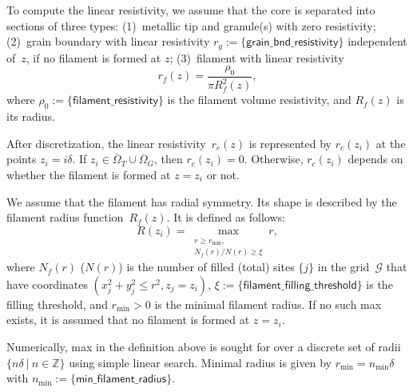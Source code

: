 \documentclass[10pt]{article}
\begin{document}
To compute the linear resistivity, we assume that the core is separated into
sections of three types: (1)~metallic tip and granule(s) with zero resistivity;
(2)~grain boundary with linear resistivity
$r_g := \{ \mathsf{grain\_bnd\_resistivity} \}$ independent of~$z$, if no
filament is formed at $z$; (3)~filament with linear resistivity
\begin{equation}
	r_f(z) = \frac{\rho_0}{\pi R_f^2(z)},
\end{equation}
where $\rho_0 := \{ \mathsf{filament\_resistivity} \}$ is the filament volume
resistivity, and $R_f(z)$ is its radius.

After discretization, the linear resistivity~$r_c(z)$ is represented by $r_c(z_i)$
at the points $z_i = i \delta$. If
$z_i \in \overline\Omega_T \cup \overline\Omega_G$, then $r_c(z_i) = 0$.
Otherwise, $r_c(z_i)$ depends on whether the filament is formed at $z = z_i$
or not.

We assume that the filament has radial symmetry. Its shape is described by the
filament radius function~$R_f(z)$. It is defined as follows:
\begin{equation}
	R(z_i) = \max_{\substack{r \geq r_{\min}, \\ N_f(r)/N(r) \geq \xi}} r,
\end{equation}
where $N_f(r)$ ($N(r)$) is the number of filled (total) sites $\{ j \}$
in the grid~$\mathcal{G}$ that have coordinates $(x_j^2 + y_j^2 \leq r^2, z_j = z_i)$,
$\xi := \{ \mathsf{filament\_filling\_threshold} \}$ is the filling threshold, and
$r_{\min} > 0$ is the minimal filament radius. If no such max exists, it is assumed
that no filament is formed at $z = z_i$.

Numerically, max in the definition above is sought for over a discrete set of
radii $\{ n\delta \ | \ n \in \mathbb{Z} \}$ using simple linear search. Minimal
radius is given by $r_{\min} = n_{\min} \delta$ with
$n_{\min} := \{ \mathsf{min\_filament\_radius} \}$.
\end{document}
